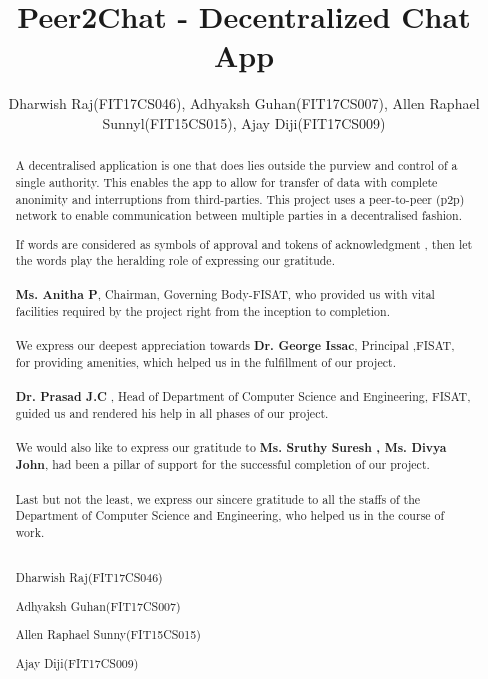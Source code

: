 \documentclass{fisatproject}
\title{Peer2Chat - Decentralized Chat App }
\author{Dharwish Raj(FIT17CS046), Adhyaksh Guhan(FIT17CS007), Allen Raphael Sunnyl(FIT15CS015), Ajay Diji(FIT17CS009)}
\begin{document}
\maketitle

\makecert

\newpage
\setcounter{page}{1}
\renewcommand\abstractname{ABSTRACT}
\begin{abstract}
\vspace{5cm}
A decentralised application is one that does lies outside the purview and control of a single authority. This enables the app to allow for transfer of data with complete anonimity and interruptions from third-parties. This project uses a peer-to-peer (p2p) network to enable communication between multiple parties in a decentralised fashion.
\end{abstract}


\newpage
\renewcommand\abstractname{ACKNOWLEDGMENT}
\begin{abstract}
\vspace{5cm}
If words are considered as symbols of approval and tokens of acknowledgment , then let the words play the heralding role of expressing our gratitude. \\ \\
 \textbf{Ms. Anitha P}, Chairman, Governing Body-FISAT, who provided us with vital facilities required by the project right from the inception to completion. \\ \\
 We express our deepest appreciation towards \textbf{Dr. George Issac}, Principal ,FISAT, for providing amenities, which helped us in the fulfillment of our project. \\ \\
 \textbf{Dr. Prasad J.C} , Head of Department of Computer Science and Engineering, FISAT, guided us  and rendered his help in all phases of our project. \\ \\
 We would also like to express our gratitude to \textbf{Ms. Sruthy Suresh , Ms. Divya John}, had been a pillar of support for the successful completion of our project. \\ \\
 Last but not the least, we express our sincere gratitude to all the staffs of the Department of Computer Science  and Engineering, who helped us in the course of work. \\ \\

\vspace{1cm}
\begin{flushright}
Dharwish Raj(FIT17CS046)

Adhyaksh Guhan(FIT17CS007)

Allen Raphael Sunny(FIT15CS015)

Ajay Diji(FIT17CS009)
\end{flushright}
\end{abstract}
\newpage
\end{document}
